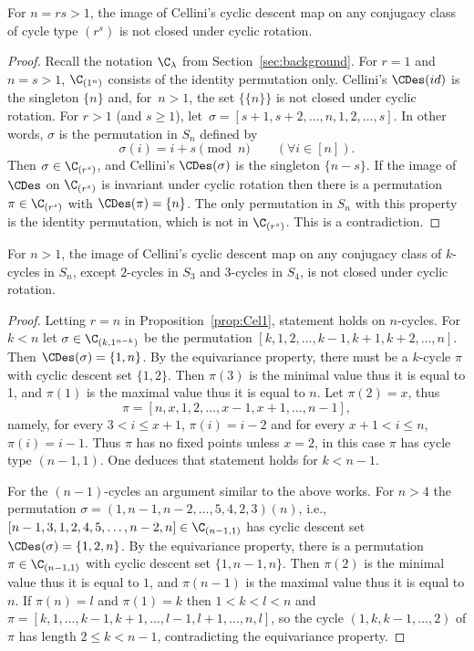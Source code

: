 \begin{proposition}\label{prop:Cel1}
	For $n = rs > 1$, the image of Cellini's cyclic descent map on any conjugacy class of cycle type $(r^s)$ is not closed under cyclic rotation.
\end{proposition}
	
\begin{proof}
	Recall the notation $\C_\lambda$ from Section~\ref{sec:background}.
	For $r=1$ and $n = s > 1$, $\C_{(1^n)}$ consists of the identity permutation only. Cellini's $\CDes(id)$ is the singleton $\{n\}$ and, for~$n > 1$, the set $\{\{n\}\}$ is not closed under cyclic rotation.
	For $r>1$ (and $s \ge 1$), 
    let~$\sigma = [s+1,s+2,\dots,n,1,2,\dots,s]$.
    In other words, $\sigma$ is the permutation in $S_n$ defined by 
	\[
		\sigma(i) = i+s \pmod{n} \qquad (\forall i\in [n]).
	\]
	Then $\sigma \in \C_{(r^s)}$, 
    and Cellini's $\CDes(\sigma)$ is the singleton $\{n-s\}$. 
    If the image of $\CDes$ on $\C_{(r^s)}$ is invariant under cyclic rotation then there is a permutation $\pi \in \C_{(r^s)}$ with $\CDes(\pi) = \{n\}$. The only permutation in $S_n$ with this property is the identity permutation, which is not in $\C_{(r^s)}$. This is a contradiction.
\end{proof}
	
\begin{proposition}
	For $n > 1$, the image of Cellini's cyclic descent map on any conjugacy class of $k$-cycles in $S_n$, except $2$-cycles in $S_3$ and $3$-cycles in $S_4$, is not closed under cyclic rotation.
\end{proposition}
	
\begin{proof}
	Letting $r=n$ in Proposition~\ref{prop:Cel1}, statement holds on $n$-cycles.
	For $k<n$ let $\sigma\in \C_{(k,1^{n-k})}$ be the permutation $[k,1,2,\dots,k-1,k+1,k+2,\dots,n]$. Then $\CDes(\sigma)=\{1,n\}$.
	By the equivariance property,  there must be a $k$-cycle $\pi$ with cyclic descent set $\{1,2\}$. Then $\pi(3)$ is the minimal value thus it is equal to 1, and $\pi(1)$
	is the maximal value thus it is equal to $n$. Let $\pi(2)=x$, thus
	\[
		\pi=[n,x,1,2,\dots,x-1,x+1,\dots,n-1],
	\]
	namely, for every $3<i\le x+1$, $\pi(i)=i-2$ and for every $x+1<i\le n$, $\pi(i)=i-1$. Thus $\pi$ has no fixed points unless $x=2$, in this case $\pi$
	has cycle type $(n-1,1)$.  One deduces that statement holds for $k<n-1$.
		
	For the $(n-1)$-cycles an argument similar to the above works. For $n>4$ the permutation $\sigma=(1,n-1,n-2,\ldots,5,4,2,3)(n)$, i.e., $[n-1,3,1,2,4,5,\ldots,n-2,n]\in \C_{(n-1,1)}$ has cyclic descent set $\CDes(\sigma)=\{1,2,n\}$. 
	By the equivariance property, there is a permutation $\pi\in \C_{(n-1,1)}$ with cyclic descent set $\{1,n-1,n\}$. Then $\pi(2)$ is the minimal value thus it is equal to $1$, and $\pi(n-1)$ is the maximal value thus it is equal to $n$. If $\pi(n)=l$ and $\pi(1)=k$ then $1<k<l<n$ and $\pi=[k,1,\dots,k-1,k+1,...,l-1,l+1,\dots,n,l]$, 
	so the cycle $(1,k,k-1,\ldots,2)$ of $\pi$ has length $2\le k<n-1$,  
	contradicting the equivariance property.
\end{proof}

